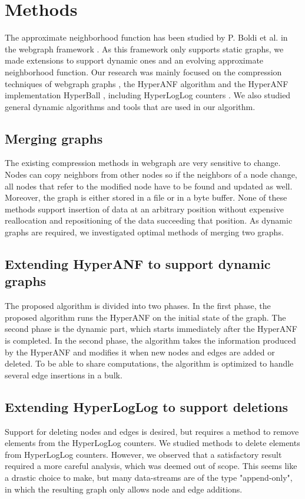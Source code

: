 \chapter{Methods}

The approximate neighborhood function has been studied by P. Boldi et al. in the webgraph framework \cite{webgraph}. As this framework only supports static graphs, we made extensions to support dynamic ones and an evolving approximate neighborhood function. Our research was mainly focused on the compression techniques of webgraph graphs \cite{webgraph-compression}, the HyperANF algorithm \cite{hyperanf} and the HyperANF implementation HyperBall \cite{hyperball}, including HyperLogLog counters \cite{hyperloglog}. We also studied general dynamic algorithms and tools that are used in our algorithm.

\section{Merging graphs}
The existing compression methods in webgraph are very sensitive to change. Nodes can copy neighbors from other nodes so if the neighbors of a node change, all nodes that refer to the modified node have to be found and updated as well. Moreover, the graph is either stored in a file or in a byte buffer. None of these methods support insertion of data at an arbitrary position without expensive reallocation and repositioning of the data succeeding that position. As dynamic graphs are required, we investigated optimal methods of merging two graphs.

\section{Extending HyperANF to support dynamic graphs}
The proposed algorithm is divided into two phases. In the first phase, the proposed algorithm runs the HyperANF on the initial state of the graph. The second phase is the dynamic part, which starts immediately after the HyperANF is completed. In the second phase, the algorithm takes the information produced by the HyperANF and modifies it when new nodes and edges are added or deleted. To be able to share computations, the algorithm is optimized to handle several edge insertions in a bulk.

\section{Extending HyperLogLog to support deletions}
Support for deleting nodes and edges is desired, but requires a method to remove elements from the HyperLogLog counters. We studied methods to delete elements from HyperLogLog counters. However, we observed that a satisfactory result required a more careful analysis, which was deemed out of scope. This seems like a drastic choice to make, but many data-streams are of the type "append-only", in which the resulting graph only allows node and edge additions.

